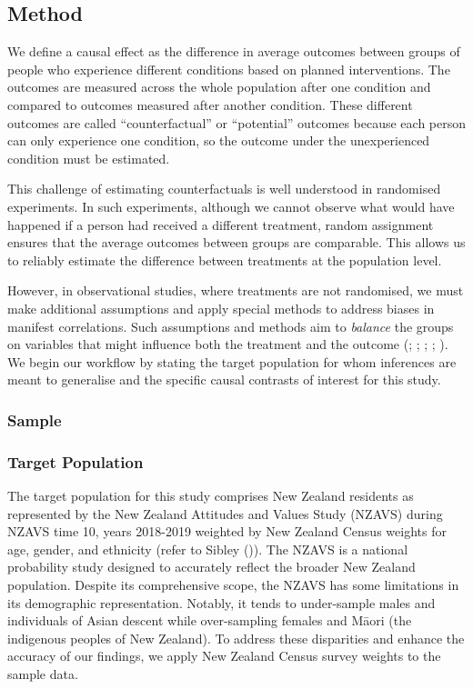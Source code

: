 \documentclass[
  single column]{article}
\begin{document}
\subsection{Method}\label{method}

We define a causal effect as the difference in average outcomes between
groups of people who experience different conditions based on planned
interventions. The outcomes are measured across the whole population
after one condition and compared to outcomes measured after another
condition. These different outcomes are called ``counterfactual'' or
``potential'' outcomes because each person can only experience one
condition, so the outcome under the unexperienced condition must be
estimated.

This challenge of estimating counterfactuals is well understood in
randomised experiments. In such experiments, although we cannot observe
what would have happened if a person had received a different treatment,
random assignment ensures that the average outcomes between groups are
comparable. This allows us to reliably estimate the difference between
treatments at the population level.

However, in observational studies, where treatments are not randomised,
we must make additional assumptions and apply special methods to address
biases in manifest correlations. Such assumptions and methods aim to
\emph{balance} the groups on variables that might influence both the
treatment and the outcome (;
; ; ;
). We begin our
workflow by stating the target population for whom inferences are meant
to generalise and the specific causal contrasts of interest for this
study.

\subsubsection{Sample}\label{sample}

\subsubsection{Target Population}\label{target-population}

The target population for this study comprises New Zealand residents as
represented by the New Zealand Attitudes and Values Study (NZAVS) during
NZAVS time 10, years 2018-2019 weighted by New Zealand Census weights
for age, gender, and ethnicity (refer to Sibley
()). The NZAVS is a national probability
study designed to accurately reflect the broader New Zealand population.
Despite its comprehensive scope, the NZAVS has some limitations in its
demographic representation. Notably, it tends to under-sample males and
individuals of Asian descent while over-sampling females and Māori (the
indigenous peoples of New Zealand). To address these disparities and
enhance the accuracy of our findings, we apply New Zealand Census survey
weights to the sample data.
\end{document}
